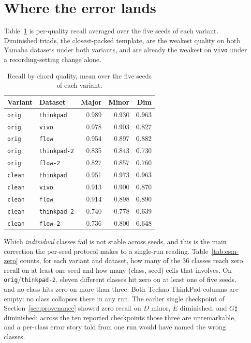 \documentclass[pdflatex,sn-mathphys-num]{sn-jnl}
\begin{document}
\section{Where the error lands}\label{sec:perclass}

Table~\ref{tab:esm-quality} is per-quality recall averaged over the five seeds of each variant. Diminished triads, the closest-packed template, are the weakest quality on both Yamaha datasets under both variants, and are already the weakest on \texttt{vivo} under a recording-setting change alone.

\begin{table}[t]
\caption{Recall by chord quality, mean over the five seeds of each variant.}\label{tab:esm-quality}
\setlength{\tabcolsep}{5pt}
\begin{tabular}{@{}llrrr@{}}
\toprule
Variant & Dataset & Major & Minor & Dim \\
\midrule
\texttt{orig} & \texttt{thinkpad} & 0.989 & 0.930 & 0.963 \\
\texttt{orig} & \texttt{vivo} & 0.978 & 0.903 & 0.827 \\
\texttt{orig} & \texttt{flow} & 0.954 & 0.897 & 0.882 \\
\texttt{orig} & \texttt{thinkpad-2} & 0.835 & 0.843 & 0.730 \\
\texttt{orig} & \texttt{flow-2} & 0.827 & 0.857 & 0.760 \\
\texttt{clean} & \texttt{thinkpad} & 0.951 & 0.973 & 0.963 \\
\texttt{clean} & \texttt{vivo} & 0.913 & 0.900 & 0.870 \\
\texttt{clean} & \texttt{flow} & 0.914 & 0.898 & 0.890 \\
\texttt{clean} & \texttt{thinkpad-2} & 0.740 & 0.778 & 0.639 \\
\texttt{clean} & \texttt{flow-2} & 0.736 & 0.800 & 0.648 \\
\bottomrule
\end{tabular}
\end{table}

Which \emph{individual} classes fail is not stable across seeds, and this is the main correction the per-seed protocol makes to a single-run reading. Table~\ref{tab:esm-zero} counts, for each variant and dataset, how many of the 36 classes reach zero recall on at least one seed and how many (class, seed) cells that involves. On \texttt{orig}/\texttt{thinkpad-2}, eleven different classes hit zero on at least one of five seeds, and no class hits zero on more than three. Both Techno ThinkPad columns are empty: no class collapses there in any run. The earlier single checkpoint of Section~\ref{sec:provenance} showed zero recall on $D$ minor, $E$ diminished, and $G\sharp$ diminished; across the ten reported checkpoints those three are unremarkable, and a per-class error story told from one run would have named the wrong classes.
\end{document}
